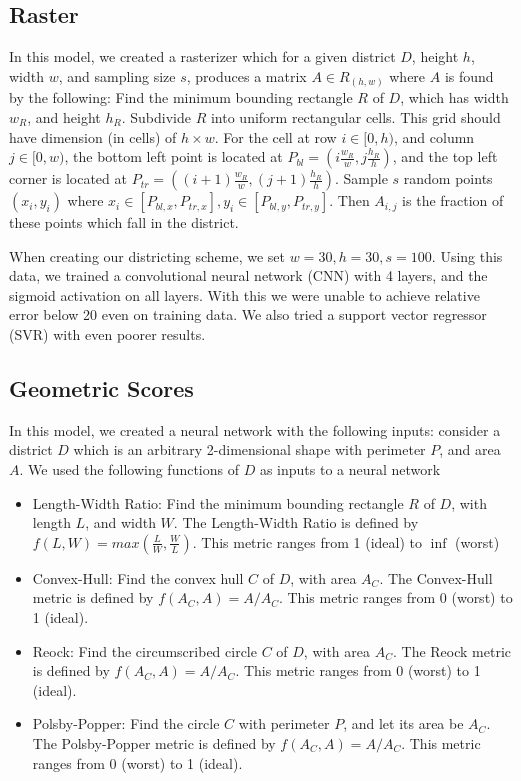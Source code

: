 \documentclass{article}
\begin{document}
\subsection{Raster}
In this model, we created a rasterizer which for a given district $D$, height $h$, width $w$, and sampling size $s$, produces a matrix $A\in R_{(h, w)}$ where $A$ is found by the following: Find the minimum bounding rectangle $R$ of $D$, which has width $w_R$, and height $h_R$. Subdivide $R$ into uniform rectangular cells. This grid should have dimension (in cells) of $h\times w$. For the cell at row $i\in[0, h)$, and column $j\in[0, w)$, the bottom left point is located at $P_{bl}=(i\frac{w_R}{w}, j\frac{h_R}{h})$, and the top left corner is located at $P_{tr}=((i+1)\frac{w_R}{w}, (j+1)\frac{h_R}{h})$. Sample $s$ random points $(x_i, y_i)$ where $x_i\in [P_{bl, x}, P_{tr, x}], y_i\in [P_{bl, y}, P_{tr, y}]$. Then $A_{i, j}$ is the fraction of these points which fall in the district.

When creating our districting scheme, we set $w=30, h=30, s=100$. Using this data, we trained a convolutional neural network (CNN) with 4 layers, and the sigmoid activation on all layers. With this we were unable to achieve relative error below 20 even on training data. We also tried a support vector regressor (SVR) with even poorer results.

\subsection{Geometric Scores}
In this model, we created a neural network with the following inputs: consider a district $D$ which is an arbitrary 2-dimensional shape with perimeter $P$, and area $A$. We used the following functions of $D$ as inputs to a neural network
\begin{itemize}
\item Length-Width Ratio: Find the minimum bounding rectangle $R$ of $D$, with length $L$, and width $W$. The Length-Width Ratio is defined by$f(L, W) = max(\frac{L}{W}, \frac{W}{L})$. This metric ranges from 1 (ideal) to $\inf$ (worst)
\item Convex-Hull: Find the convex hull $C$ of $D$, with area $A_C$. The Convex-Hull metric is defined by $f(A_C, A) = A / A_C$. This metric ranges from 0 (worst) to 1 (ideal).
\item Reock: Find the circumscribed circle $C$ of $D$, with area $A_C$. The Reock metric is defined by $f(A_C, A) = A / A_C$. This metric ranges from 0 (worst) to 1 (ideal).
\item Polsby-Popper: Find the circle $C$ with perimeter $P$, and let its area be $A_C$. The Polsby-Popper metric is defined by $f(A_C, A) = A / A_C$. This metric ranges from 0 (worst) to 1 (ideal).
\end{itemize}
\end{document}
